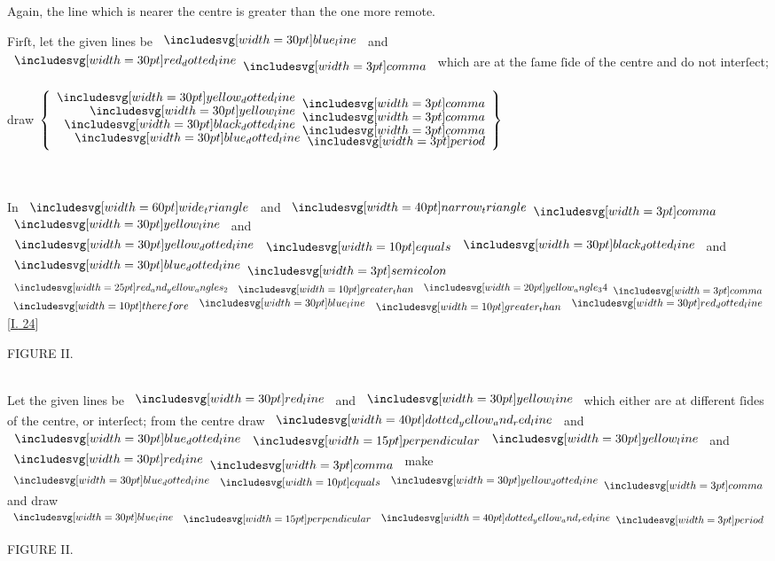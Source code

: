 \documentclass[11pt,preview]{standalone}
\begin{document}
\begin{center}
    Again, the line which is nearer the centre is greater than the one more remote.
\end{center}

\begin{center}
    Firſt, let the given lines be $\blueline$ and $\dottedredline \bcomma$ which are at the ſame ſide of the centre and do not interſect;\\
    \hfill\\
    draw $\left\{\begin{aligned}\dottedyellowline \bcomma \\[-2ex] \yellowline \bcomma \\[-2ex] \dottedblackline \bcomma \\[-2ex] \dottedblueline \bperiod \end{aligned}\right\}$\\
    \hfill\\
    \hfill\\
\end{center}

\begin{center}
    In $\img[0][0][60]{wide_triangle}$ and $\img[0][0][40]{narrow_triangle} \bcomma$\\
    $\yellowline$ and $\dottedyellowline \bequals \dottedblackline$ and $\dottedblueline \bsemicolon$\\
    $\img{red_and_yellow_angles_2} \bgt \img[0][0][20]{yellow_angle_34} \bcomma$\\
    $\btherefore \blueline \bgt \dottedredline$ [\hyperref[book1pr24]{\textsc{I.} 24}]
\end{center}

\hfill

\begin{minipage}[t]{0.54\textwidth}
    \vspace{0pt}
    \begin{center}
        FIGURE II.\\
        \hfill\\
        \raggedright Let the given lines be $\redline$ and $\yellowline$ which either are at different ſides of the centre, or interſect; from the centre draw $\img[0.5][0][40]{dotted_yellow_and_red_line}$ and $\dottedblueline \bperp \yellowline$ and $\redline \bcomma$ make $\dottedblueline \bequals \dottedyellowline \bcomma$ and draw $\blueline \bperp \img[0.5][0][40]{dotted_yellow_and_red_line} \bperiod$
    \end{center}
\end{minipage}%
\hfill
\begin{minipage}[t]{0.43\textwidth}
    \vspace{0pt}
    \begin{center}
        FIGURE II.
    \end{center}
    \hfill\\
    
\end{minipage}%
\end{document}

